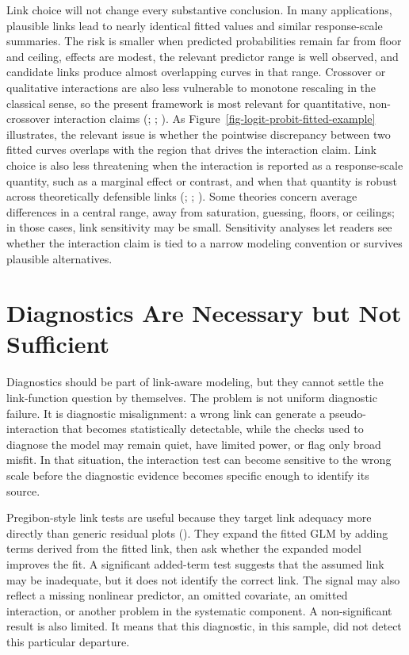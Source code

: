 \documentclass[
  man,
  longtable,
  nolmodern,
  notxfonts,
  notimes,
  colorlinks=true,linkcolor=blue,citecolor=blue,urlcolor=blue]{apa7}
\begin{document}
Link choice will not change every substantive conclusion. In many
applications, plausible links lead to nearly identical fitted values and
similar response-scale summaries. The risk is smaller when predicted
probabilities remain far from floor and ceiling, effects are modest, the
relevant predictor range is well observed, and candidate links produce
almost overlapping curves in that range. Crossover or qualitative
interactions are also less vulnerable to monotone rescaling in the
classical sense, so the present framework is most relevant for
quantitative, non-crossover interaction claims
(; ; ). As
Figure~\ref{fig-logit-probit-fitted-example} illustrates, the relevant
issue is whether the pointwise discrepancy between two fitted curves
overlaps with the region that drives the interaction claim. Link choice
is also less threatening when the interaction is reported as a
response-scale quantity, such as a marginal effect or contrast, and when
that quantity is robust across theoretically defensible links
(;
;
). Some theories concern average
differences in a central range, away from saturation, guessing, floors,
or ceilings; in those cases, link sensitivity may be small. Sensitivity
analyses let readers see whether the interaction claim is tied to a
narrow modeling convention or survives plausible alternatives.

\section{Diagnostics Are Necessary but Not
Sufficient}\label{diagnostics-are-necessary-but-not-sufficient}

Diagnostics should be part of link-aware modeling, but they cannot
settle the link-function question by themselves. The problem is not
uniform diagnostic failure. It is diagnostic misalignment: a wrong link
can generate a pseudo-interaction that becomes statistically detectable,
while the checks used to diagnose the model may remain quiet, have
limited power, or flag only broad misfit. In that situation, the
interaction test can become sensitive to the wrong scale before the
diagnostic evidence becomes specific enough to identify its source.

Pregibon-style link tests are useful because they target link adequacy
more directly than generic residual plots
(). They expand the fitted
GLM by adding terms derived from the fitted link, then ask whether the
expanded model improves the fit. A significant added-term test suggests
that the assumed link may be inadequate, but it does not identify the
correct link. The signal may also reflect a missing nonlinear predictor,
an omitted covariate, an omitted interaction, or another problem in the
systematic component. A non-significant result is also limited. It means
that this diagnostic, in this sample, did not detect this particular
departure.
\end{document}
